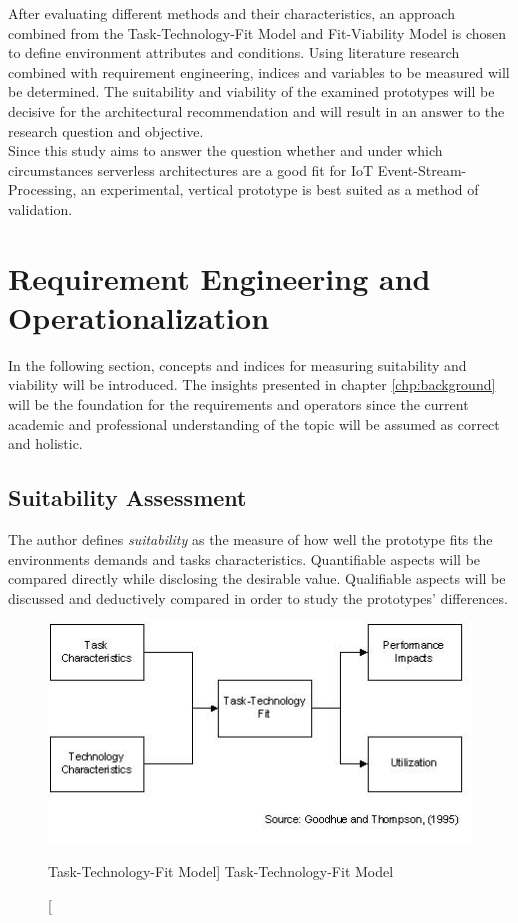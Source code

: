     After evaluating different methods and their characteristics, an approach combined from the Task-Technology-Fit Model and Fit-Viability Model is chosen to define environment attributes and conditions. Using literature research combined with requirement engineering, indices and variables to be measured will be determined. The suitability and viability of the examined prototypes will be decisive for the architectural recommendation and will result in an answer to the research question and objective.\\
    Since this study aims to answer the question whether and under which circumstances serverless architectures are a good fit for IoT Event-Stream-Processing, an experimental, vertical prototype is best suited as a method of validation. 


\section{Requirement Engineering and Operationalization}\label{sec:operationalization}

In the following section, concepts and indices for measuring suitability and viability will be introduced. The insights presented in chapter \ref{chp:background} will be the foundation for the requirements and operators since the current academic and professional understanding of the topic will be assumed as correct and holistic.   

\subsection{Suitability Assessment}

The author defines \textit{suitability} as the measure of how well the prototype fits the environments demands and tasks characteristics. Quantifiable aspects will be compared directly while disclosing the desirable value. Qualifiable aspects will be discussed and deductively compared in order to study the prototypes' differences. 

\begin{figure}[ht]
    \includegraphics[width=0.7\linewidth]{images/methodology/ttf.jpg}\centering
    \caption
    [Task-Technology-Fit Model]
    {Task-Technology-Fit Model \cite{Goodhue1995Task-TechnologyPerformance}}
\end{figure}

